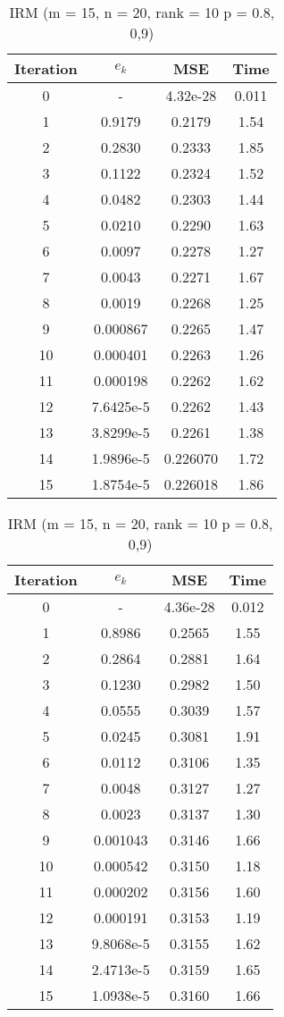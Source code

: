 \documentclass[oneside,final,14pt]{extreport} %
\begin{document}
\begin{table}[ht]
	\centering
	\begin{tabular}{|c|c|c|c|}
	\hline Iteration & $e_k$ & MSE & Time \\ \hline
	0 & - & 4.32e-28 & 0.011  \\ \hline
	1 & 0.9179 & 0.2179 & 1.54 \\ \hline
	2 & 0.2830 & 0.2333 & 1.85 \\ \hline
	3 & 0.1122 & 0.2324 & 1.52 \\ \hline
	4 & 0.0482 & 0.2303 & 1.44 \\ \hline
	5 & 0.0210 & 0.2290 & 1.63 \\ \hline
	6 & 0.0097 & 0.2278 & 1.27 \\ \hline
	7 & 0.0043 & 0.2271 & 1.67 \\ \hline
	8 & 0.0019 & 0.2268 & 1.25 \\ \hline
	9 & 0.000867 & 0.2265 & 1.47 \\ \hline
	10 & 0.000401 & 0.2263 & 1.26 \\ \hline
	11 & 0.000198 & 0.2262 & 1.62 \\ \hline
	12 & 7.6425e-5 & 0.2262 & 1.43 \\ \hline
	13 & 3.8299e-5 & 0.2261 & 1.38 \\ \hline
	14 & 1.9896e-5 & 0.226070 & 1.72 \\ \hline
	15 & 1.8754e-5 & 0.226018 & 1.86 \\ \hline
	\end{tabular}
	\begin{tabular}{|c|c|c|c|}
		\hline Iteration & $e_k$ & MSE & Time \\ \hline
		0 & - & 4.36e-28 & 0.012 \\ \hline
		1 & 0.8986 & 0.2565 & 1.55 \\ \hline
		2 & 0.2864 & 0.2881 & 1.64 \\ \hline
		3 & 0.1230 & 0.2982 & 1.50 \\ \hline
		4 & 0.0555 & 0.3039 & 1.57 \\ \hline
		5 & 0.0245 & 0.3081 & 1.91 \\ \hline
		6 & 0.0112 & 0.3106 & 1.35 \\ \hline
		7 & 0.0048 & 0.3127 & 1.27 \\ \hline
		8 & 0.0023 & 0.3137 & 1.30 \\ \hline
		9 & 0.001043 & 0.3146 & 1.66 \\ \hline
		10 & 0.000542 & 0.3150 & 1.18 \\ \hline
		11 & 0.000202 & 0.3156 & 1.60 \\ \hline
		12 & 0.000191 & 0.3153 & 1.19 \\ \hline
		13 & 9.8068e-5 & 0.3155 & 1.62 \\ \hline
		14 & 2.4713e-5 & 0.3159 & 1.65 \\ \hline
		15 & 1.0938e-5 & 0.3160 & 1.66 \\ \hline
	\end{tabular}
	\caption{IRM (m = 15, n = 20, rank = 10 p = 0.8, 0,9)}
	\label{exp12IRM}
\end{table}
\end{document}
